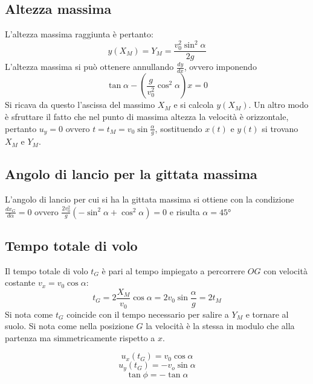 \documentclass[class=book, crop=false, oneside, 12pt]{standalone}
\begin{document}
	\subsection{Altezza massima}
	L'altezza massima raggiunta \`e pertanto:
	$$y(X_M)=Y_M=\dfrac{v_0^2\sin^2\alpha}{2g}$$
	L'altezza massima si pu\`o ottenere annullando $\frac{dy}{dx}$, ovvero imponendo
	$$\tan\alpha-\left(\dfrac{g}{v_0^2}\cos^2\alpha\right)x=0$$
	Si ricava da questo l'ascissa del massimo $X_M$ e si calcola $y(X_M)$.
	Un altro modo \`e sfruttare il fatto che nel punto di massima altezza la velocit\`a \`e orizzontale, pertanto $u_y=0$ ovvero $t=t_M=v_0\sin\frac{\alpha}{g}$, sostituendo $x(t)$ e $y(t)$ si trovano $X_M$ e $Y_M$.
	\subsection{Angolo di lancio per la gittata massima}
	L'angolo di lancio per cui si ha la gittata massima si ottiene con la condizione $\frac{dx_G}{d\alpha}=0$ ovvero $\frac{2v_0^2}{g}(-\sin^2\alpha+\cos^2\alpha)=0$ e risulta $\alpha=45\si{\degree}$
	\subsection{Tempo totale di volo}
	Il tempo totale di volo $t_G$ \`e pari al tempo impiegato a percorrere $OG$ con velocit\`a costante $v_x=v_0\cos\alpha$:
	$$t_G=2\dfrac{X_M}{v_0}\cos\alpha=2v_0\sin\dfrac{\alpha}{g}=2t_M$$
	Si nota come $t_G$ coincide con il tempo necessario per salire a $Y_M$ e tornare al suolo.
	Si nota come nella posizione $G$ la velocit\`a \`e la stessa in modulo che alla partenza ma simmetricamente rispetto a $x$.
  \begin{multicols}{3}
    \noindent
    $$u_x(t_G)=v_0\cos\alpha$$
    $$u_y(t_G)=-v_o\sin\alpha$$
    $$\tan\phi=-\tan\alpha$$
  \end{multicols}
\end{document}
